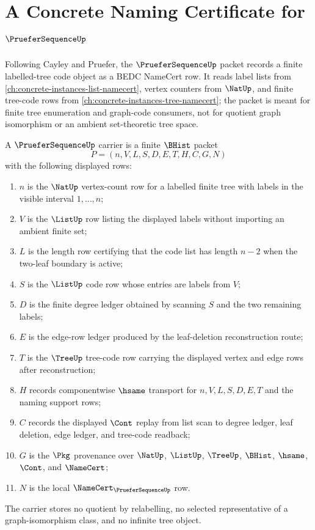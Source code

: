 \chapter{A Concrete Naming Certificate for $\PrueferSequenceUp$}
\label{ch:concrete-instances-pruefer-sequence-namecert}

Following Cayley and Pruefer, the $\PrueferSequenceUp$ packet records a finite labelled-tree code object as a BEDC NameCert row. It reads label lists from \autoref{ch:concrete-instances-list-namecert}, vertex counters from $\NatUp$, and finite tree-code rows from \autoref{ch:concrete-instances-tree-namecert}; the packet is meant for finite tree enumeration and graph-code consumers, not for quotient graph isomorphism or an ambient set-theoretic tree space.

\begin{definition}
\label{def:prufer-sequence-carrier}
A $\PrueferSequenceUp$ carrier is a finite $\BHist$ packet
$$
P=(n,V,L,S,D,E,T,H,C,G,N)
$$
with the following displayed rows:
\begin{enumerate}
\item $n$ is the $\NatUp$ vertex-count row for a labelled finite tree with labels in the visible interval $1,\ldots,n$;
\item $V$ is the $\ListUp$ row listing the displayed labels without importing an ambient finite set;
\item $L$ is the length row certifying that the code list has length $n-2$ when the two-leaf boundary is active;
\item $S$ is the $\ListUp$ code row whose entries are labels from $V$;
\item $D$ is the finite degree ledger obtained by scanning $S$ and the two remaining labels;
\item $E$ is the edge-row ledger produced by the leaf-deletion reconstruction route;
\item $T$ is the $\TreeUp$ tree-code row carrying the displayed vertex and edge rows after reconstruction;
\item $H$ records componentwise $\hsame$ transport for $n,V,L,S,D,E,T$ and the naming support rows;
\item $C$ records the displayed $\Cont$ replay from list scan to degree ledger, leaf deletion, edge ledger, and tree-code readback;
\item $G$ is the $\Pkg$ provenance over $\NatUp$, $\ListUp$, $\TreeUp$, $\BHist$, $\hsame$, $\Cont$, and $\NameCert$;
\item $N$ is the local $\NameCert_{\PrueferSequenceUp}$ row.
\end{enumerate}
The carrier stores no quotient by relabelling, no selected representative of a graph-isomorphism class, and no infinite tree object.
\end{definition}

